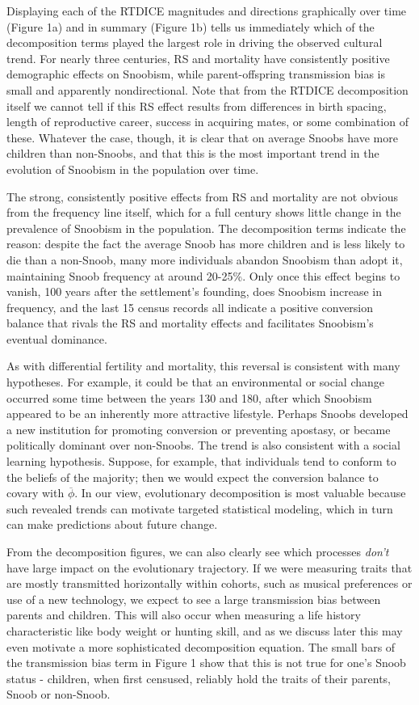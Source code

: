 Displaying each of the RTDICE magnitudes and directions graphically over time (Figure 1a) and in summary (Figure 1b) tells us immediately which of the decomposition terms played the largest role in driving the observed cultural trend.  For nearly three centuries, RS and mortality have consistently positive demographic effects on Snoobism, while parent-offspring transmission bias is small and apparently nondirectional.  Note that from the RTDICE decomposition itself we cannot tell if this RS effect results from differences in birth spacing, length of reproductive career, success in acquiring mates, or some combination of these.  Whatever the case, though, it is clear that on average Snoobs have more children than non-Snoobs, and that this is the most important trend in the evolution of Snoobism in the population over time.  

The strong, consistently positive effects from RS and mortality are not obvious from the frequency line itself, which for a full century shows little change in the prevalence of Snoobism in the population.  The decomposition terms indicate the reason: despite the fact the average Snoob has more children and is less likely to die than a non-Snoob, many more individuals abandon Snoobism than adopt it, maintaining Snoob frequency at around 20-25\%.  Only once this effect begins to vanish, 100 years after the settlement's founding, does Snoobism increase in frequency, and the last 15 census records all indicate a positive conversion balance that rivals the RS and mortality effects and facilitates Snoobism's eventual dominance.  

As with differential fertility and mortality, this reversal is consistent with many hypotheses. For example, it could be that an environmental or social change occurred some time between the years 130 and 180, after which Snoobism appeared to be an inherently more attractive lifestyle. Perhaps Snoobs developed a new institution for promoting conversion or preventing apostasy, or became politically dominant over non-Snoobs.  The trend is also consistent with a social learning hypothesis. Suppose, for example, that individuals tend to conform to the beliefs of the majority; then we would expect the conversion balance to covary with $\overline{\phi}$.  In our view, evolutionary decomposition is most valuable because such revealed trends can motivate targeted statistical modeling, which in turn can make predictions about future change.  

From the decomposition figures, we can also clearly see which processes \textit{don't} have large impact on the evolutionary trajectory. If we were measuring traits that are mostly transmitted horizontally within cohorts, such as musical preferences or use of a new technology, we expect to see a large transmission bias between parents and children.  This will also occur when measuring a life history characteristic like body weight or hunting skill, and as we discuss later this may even motivate a more sophisticated decomposition equation. The small bars of the transmission bias term in Figure 1 show that this is not true for one's Snoob status - children, when first censused, reliably hold the traits of their parents, Snoob or non-Snoob.


